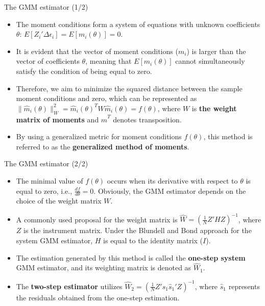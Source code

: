 \documentclass[color=usenames,dvipsnames]{beamer}
\begin{document}
\begin{frame}{The GMM estimator (1/2) }
    \begin{itemize}
        \item The moment conditions form a system of equations with unknown coefficients $\theta$: $E[Z_i'\Delta \epsilon_i] = E[m_i (\theta)] = 0$.
        
        \item It is evident that the vector of moment conditions ($m_i$) is larger than the vector of coefficients $\theta$, meaning that $E[m_i (\theta)]$ cannot simultaneously satisfy the condition of being equal to zero.

        \item Therefore, we aim to minimize the squared distance between the sample moment conditions and zero, which can be represented as $\| \hat{m}_i(\theta) \|_W^2 = \hat{m}_i(\theta)^T W \hat{m}_i(\theta) = f(\theta)$, where $W$ is \textbf{the weight matrix of moments} and $\hat{m}^T$ denotes transposition.

        \item By using a generalized metric for moment conditions $f(\theta)$, this method is referred to as the \textbf{generalized method of moments}.

    \end{itemize}
\end{frame}

\begin{frame}{The GMM estimator (2/2)}
    \begin{itemize}
        \item The minimal value of $f(\theta)$ occurs when its derivative with respect to $\theta$ is equal to zero, i.e., $\frac{df}{d\theta} = 0$. Obviously, the GMM estimator depends on the choice of the weight matrix $W$.

        \item A commonly used proposal for the weight matrix is $\hat{W} = \left( \frac{1}{N} Z'HZ \right)^{-1}$, where $Z$ is the instrument matrix. Under the Blundell and Bond approach for the system GMM estimator, $H$ is equal to the identity matrix ($I$).

        \item The estimation generated by this method is called the \textbf{one-step system} GMM estimator, and its weighting matrix is denoted as $\hat{W}_1$.

        \item The \textbf{two-step estimator} utilizes $\hat{W}_2 = \left( \frac{1}{N} Z'\hat{s}_1 \hat{s}_1' Z \right)^{-1}$, where $\hat{s}_1$ represents the residuals obtained from the one-step estimation.

    \end{itemize}
    
\end{frame}
\end{document}
